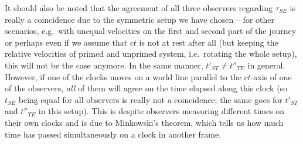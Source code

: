 \begin{ex}
It should also be noted that the agreement of all three observers regarding $\tau_{SE}$ is really a coincidence due to the symmetric setup we have chosen -- for other scenarios, e.g.~with unequal velocities on the first and second part of the journey or perhaps even if we assume that $ct$ is not at rest after all (but keeping the relative velocities of primed and unprimed system, i.e.~rotating the whole setup), this will not be the case anymore. In the same manner, $t'_{ST} \neq t''_{TE}$ in general. However, if one of the clocks moves on a world line parallel to the $ct$-axis of one of the observers, \emph{all} of them will agree on the time elapsed along this clock (so $t_{SE}$ being equal for all observers is really not a coincidence; the same goes for $t'_{ST}$ and $t''_{TE}$ in this setup). This is despite observers measuring different times on their own clocks and is due to Minkowski's theorem, which tells us how much time has passed simultaneously on a clock in another frame.
\end{ex}

